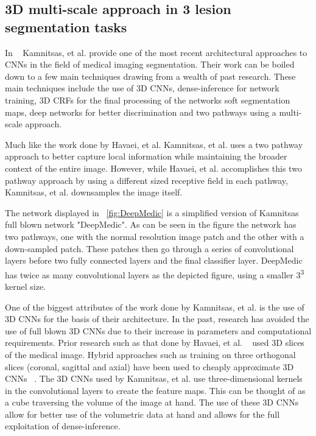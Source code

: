\documentclass{sig-alternate}
\begin{document}
\subsection{3D multi-scale approach in 3 lesion segmentation tasks}
\label{sec:3DMultiScale}

In ~\cite{Kamnitsas:2017} Kamnitsas, et al. provide one of the most recent architectural approaches to CNNs in the field of medical imaging segmentation. Their work can be boiled down to a few main techniques drawing from a wealth of past research. These main techniques include the use of 3D CNNs, dense-inference for network training, 3D CRFs for the final processing of the networks soft segmentation maps, deep networks for better discrimination and two pathways using a multi-scale approach.

Much like the work done by Havaei, et al. Kamnitsas, et al. uses a two pathway approach to better capture local information while maintaining the broader context of the entire image. However, while Havaei, et al. accomplishes this two pathway approach by using a different sized receptive field in each pathway, Kamnitsas, et al. downsamples the image itself. 


\begin{figure*}
\centering
{}
\caption{The basic neural network architecture used by Kamnitsas, et al. in ~\cite{Kamnitsas:2017}}
\label{fig:DeepMedic}
\end{figure*}

The network displayed in ~\ref{fig:DeepMedic} is a simplified version of Kamnitsas full blown network "DeepMedic". As can be seen in the figure the network has two pathways, one with the normal resolution image patch and the other with a down-sampled patch. These patches then go through a series of convolutional layers before two fully connected layers and the final classifier layer. DeepMedic has twice as many convolutional layers as the depicted figure, using a smaller 3\textsuperscript{3} kernel size.

One of the biggest attributes of the work done by Kamnitsas, et al. is the use of 3D CNNs for the basis of their architecture. In the past, research has avoided the use of full blown 3D CNNs due to their increase in parameters and computational requirements. Prior research such as that done by Havaei, et al. ~\cite{Havaei:2017} used 3D slices of the medical image. Hybrid approaches such as training on three orthogonal slices (coronal, sagittal and axial) have been used to cheaply approximate 3D CNNs ~\cite{Roth:2014}. The 3D CNNs used by Kamnitsas, et al. use three-dimensional kernels in the convolutional layers to create the feature maps. This can be thought of as a cube traversing the volume of the image at hand. The use of these 3D CNNs allow for better use of the volumetric data at hand and allows for the full exploitation of dense-inference.
\end{document}
